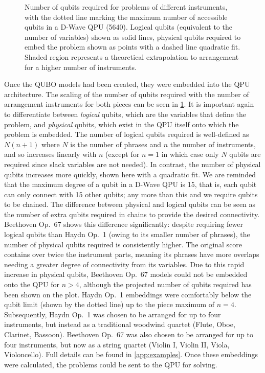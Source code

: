 \documentclass[twocolumn]{article}
\theoremstyle{definition}
\begin{document}
\begin{figure}[ht]
    \centering\footnotesize
    
    \caption{Number of qubits required for problems of different instruments, with the dotted line marking the maximum number of accessible qubits in a D-Wave QPU (\num{5640}). Logical qubits (equivalent to the number of variables) shown as solid lines, physical qubits required to embed the problem shown as points with a dashed line quadratic fit. Shaded region represents a theoretical extrapolation to arrangement for a higher number of instruments.}
    \label{fig:qubits}
\end{figure}

Once the QUBO models had been created, they were embedded into the QPU architecture. The scaling of the number of qubits required with the number of arrangement instruments for both pieces can be seen in \cref{fig:qubits}. It is important again to differentiate between \emph{logical} qubits, which are the variables that define the problem, and \emph{physical} qubits, which exist in the QPU itself onto which the problem is embedded. The number of logical qubits required is well-defined as $N(n+1)$ where $N$ is the number of phrases and $n$ the number of instruments, and so increases linearly with $n$ (except for $n=1$ in which case only $N$ qubits are required since slack variables are not needed). In contrast, the number of physical qubits increases more quickly, shown here with a quadratic fit. We are reminded that the maximum degree of a qubit in a D-Wave QPU is \num{15}, that is, each qubit can only connect with \num{15} other qubits; any more than this and we require qubits to be chained. The difference between physical and logical qubits can be seen as the number of extra qubits required in chains to provide the desired connectivity. Beethoven Op.\ 67 shows this difference significantly: despite requiring fewer logical qubits than Haydn Op.\ 1 (owing to its smaller number of phrases), the number of physical qubits required is consistently higher. The original score contains over twice the instrument parts, meaning its phrases have more overlaps needing a greater degree of connectivity from its variables. Due to this rapid increase in physical qubits, Beethoven Op.\ 67 models could not be embedded onto the QPU for $n>4$, although the projected number of qubits required has been shown on the plot. Haydn Op.\ 1 embeddings were comfortably below the qubit limit (shown by the dotted line) up to the piece maximum of $n=4$. Subsequently, Haydn Op.\ 1 was chosen to be arranged for up to four instruments, but instead as a traditional woodwind quartet (Flute, Oboe, Clarinet, Bassoon). Beethoven Op.\ 67 was also chosen to be arranged for up to four instruments, but now as a string quartet (Violin I, Violin II, Viola, Violoncello). Full details can be found in \cref{app:examples}. Once these embeddings were calculated, the problems could be sent to the QPU for solving.
\end{document}
